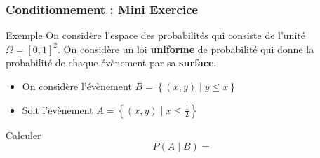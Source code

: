 \documentclass{beamer}
\begin{document}
\begin{frame}[t]
    \frametitle{Conditionnement : Mini Exercice}
    \begin{block}{Exemple}
        \small
        On considère  l'espace des probabilités qui consiste de l'unité $\Omega
        = [0,1]^2$. On considère un loi \textbf{uniforme} de probabilité qui
        donne la probabilité de chaque évènement par sa \textbf{surface}.\\[4pt]

        \begin{itemize}
            \item On considère l'évènement $B=\left\{(x,y)\;|\; y \leq x\right\}$
            \item Soit l'évènement $A= \left\{(x,y)\;|\; x \leq
                \frac{1}{2}\right\}$
        \end{itemize}
    \end{block}
    Calculer 
    $$
    P(A\;|\;B) = 
    $$
\end{frame}
\end{document}
